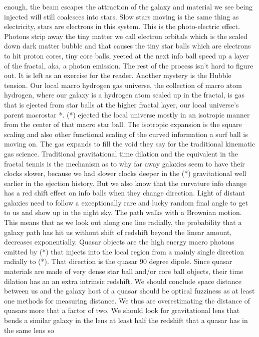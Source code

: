 \documentclass[11pt,a4paper]{article}
\begin{document}
enough, the beam escapes the attraction of the galaxy and material we
see being injected will still coalesces into stars. Slow stars moving
is the same thing as electricity, stars are electrons in this system.
This is the photo-electric effect. Photons strip away the tiny matter
we call electron orbitals which is the scaled down dark matter bubble
and that causes the tiny star balls which are electrons to hit proton
cores, tiny core balls, yeeted at the next info ball speed up a layer
of the fractal, aka, a photon emission. The rest of the process isn't
hard to figure out. It is left as an exercise for the reader. Another
mystery is the Hubble tension. Our local macro hydrogen gas universe,
the collection of macro atom hydrogen, where our galaxy is a hydrogen
atom scaled up in the fractal, is gas that is ejected from star balls
at the higher fractal layer, our local universe's parent macrostar *.
(*) ejected the local universe mostly in an isotropic manner from the 
center of that macro star ball. The isotropic expansion is the square
scaling and also other functional scaling of the curved information a
surf ball is moving on. The gas expands to fill the void they say for
the traditional kinematic gas science. Traditional gravitational time
dilation and the equivalent in the fractal tennis is the mechanism as
to why far away galaxies seem to have their clocks slower, because we
had slower clocks deeper in the (*) gravitational well earlier in the
ejection history. But we also know that the curvature info change has
a red shift effect on info balls when they change direction. Light of
distant galaxies need to follow a exceptionally rare and lucky random
final angle to get to us and show up in the night sky. The path walks
with a Brownian motion. This means that as we look out along one line
radially, the probability that a galaxy path has hit us without shift
of redshift beyond the linear amount, decreases exponentially. Quasar
objects are the high energy macro photons emitted by (*) that injects 
into the local region from a mainly single direction radially to (*).
That direction is the quasar 90 degree dipole. Since quasar materials
are made of very dense star ball and/or core ball objects, their time
dilation has an an extra intrinsic redshift. We should conclude space
distance between us and the galaxy host of a quasar should be optical
fuzziness as at least one methods for measuring distance. We thus are
overestimating the distance of quasars more that a  factor of two. We
should look for gravitational lens that bends a similar galaxy in the 
lens at least half the redshift that a quasar has in the same lens so
\end{document}
